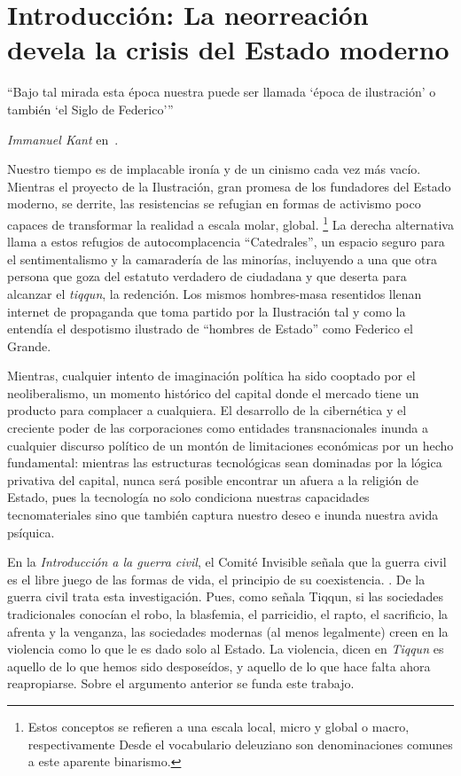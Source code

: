 \chapter{Introducción: La neorreación devela la crisis del Estado moderno}
\label{cha:la-neorreación-devela-la-crisis-del-estado-moderno}

\epigraph{\enquote{Bajo tal mirada esta época nuestra puede ser llamada \enquote{época de ilustración} o también \enquote{el Siglo de Federico}}}{\emph{Immanuel Kant} en~\autocite[p.~11]{kantQueEsIlustracion2009}.}

Nuestro tiempo es de implacable ironía y de un cinismo cada vez más vacío. Mientras el proyecto de la Ilustración, gran promesa de los fundadores del Estado moderno, se derrite, las resistencias se refugian en formas de activismo poco capaces de transformar la realidad a escala molar, global. \footnote{Estos conceptos se refieren a una escala local, micro y global o macro, respectivamente Desde el vocabulario deleuziano son denominaciones comunes a este aparente binarismo.} La derecha alternativa llama a estos refugios de autocomplacencia \enquote{Catedrales}, un espacio seguro para el sentimentalismo y la camaradería de las minorías, incluyendo a una que otra persona que goza del estatuto verdadero de ciudadana y que deserta para alcanzar el \emph{tiqqun}, la redención. Los mismos hombres-masa resentidos llenan internet de propaganda que toma partido por la Ilustración tal y como la entendía el despotismo ilustrado de \enquote{hombres de Estado} como Federico el Grande.

Mientras, cualquier intento de imaginación política ha sido cooptado por el neoliberalismo, un momento histórico del capital donde el mercado tiene un producto para complacer a cualquiera. El desarrollo de la cibernética y el creciente poder de las corporaciones como entidades transnacionales inunda a cualquier discurso político de un montón de limitaciones económicas por un hecho fundamental: mientras las estructuras tecnológicas sean dominadas por la lógica privativa del capital, nunca será posible encontrar un afuera a la religión de Estado, pues la tecnología no solo condiciona nuestras capacidades tecnomateriales sino que también captura nuestro deseo e inunda nuestra avida psíquica.

En la \emph{Introducción a la guerra civil}, el Comité Invisible señala que la guerra civil es el libre juego de las formas de vida, el principio de su coexistencia. \autocite[pág. 17]{tiqqunIntroduccionGuerraCivil2008}. De la guerra civil trata esta investigación. Pues, como señala Tiqqun, si las sociedades tradicionales conocían el robo, la blasfemia, el parricidio, el rapto, el sacrificio, la afrenta y la venganza, las sociedades modernas (al menos legalmente) creen en la violencia como lo que le es dado solo al Estado. La violencia, dicen en \emph{Tiqqun} es aquello de lo que hemos sido desposeídos, y aquello de lo que hace falta ahora reapropiarse. Sobre el argumento anterior se funda este trabajo.

